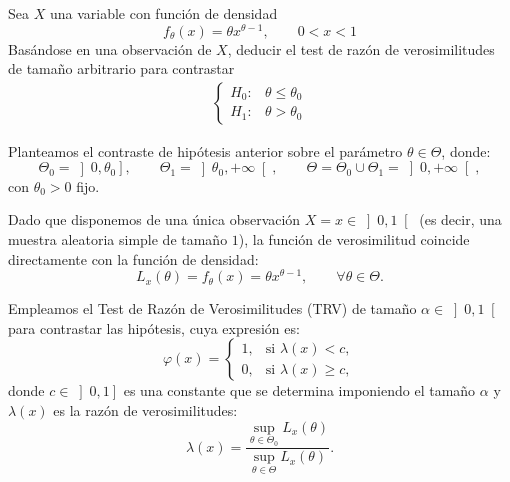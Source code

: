 \begin{ejercicio}
    Sea $X$ una variable con función de densidad
    \begin{equation*}
        f_\theta(x) = \theta x^{\theta-1}, \qquad 0<x<1
    \end{equation*}
    Basándose en una observación de $X$, deducir el test de razón de verosimilitudes de tamaño arbitrario para contrastar
    \begin{align*}
        \begin{cases}
            H_0: & \theta \leq \theta_0 \\
            H_1: & \theta > \theta_0
        \end{cases}
    \end{align*}

    Planteamos el contraste de hipótesis anterior sobre el parámetro $\theta \in \Theta$, donde:
    \begin{equation*}
        \Theta_0 = \left]0, \theta_0\right], \qquad \Theta_1 = \left]\theta_0, +\infty\right[, \qquad \Theta = \Theta_0 \cup \Theta_1 = \left]0, +\infty\right[,
    \end{equation*}
    con $\theta_0 > 0$ fijo.

    Dado que disponemos de una única observación $X = x \in \left]0, 1\right[$ (es decir, una muestra aleatoria simple de tamaño $1$), la función de verosimilitud coincide directamente con la función de densidad:
    \begin{equation*}
        L_x(\theta) = f_\theta(x) = \theta x^{\theta - 1}, \qquad \forall \theta \in \Theta.
    \end{equation*}

    Empleamos el Test de Razón de Verosimilitudes (TRV) de tamaño $\alpha \in \left]0, 1\right[$ para contrastar las hipótesis, cuya expresión es:
    \begin{equation*}
        \varphi(x) =
        \begin{cases}
            1, & \text{si } \lambda(x) < c, \\
            0, & \text{si } \lambda(x) \geq c,
        \end{cases}
    \end{equation*}
    donde $c \in \left]0, 1\right]$ es una constante que se determina imponiendo el tamaño $\alpha$ y $\lambda(x)$ es la razón de verosimilitudes:
    \begin{equation*}
        \lambda(x) = \frac{\sup\limits_{\theta \in \Theta_0} L_x(\theta)}{\sup\limits_{\theta \in \Theta} L_x(\theta)}.
    \end{equation*}


\end{ejercicio}
